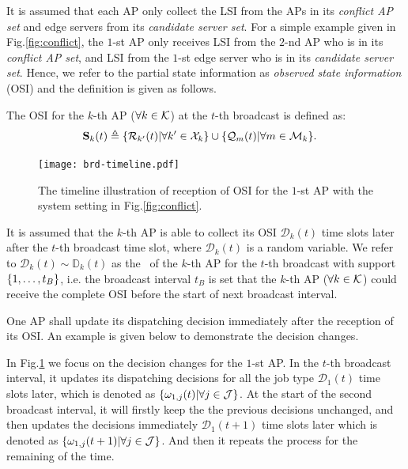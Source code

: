 It is assumed that each AP only collect the LSI from the APs in its \emph{conflict AP set} and edge servers from its \emph{candidate server set}.
For a simple example given in Fig.\ref{fig:conflict}, the $1$-st AP only receives LSI from the $2$-nd AP who is in its \emph{conflict AP set}, and LSI from the $1$-st edge server who is in its \emph{candidate server set}.
Hence, we refer to the partial state information as \emph{observed state information} (OSI) and the definition is given as follows.
\begin{definition}
    The OSI for the $k$-th AP ($\forall k\in\mathcal{K}$) at the $t$-th broadcast is defined as:
    \begin{align}
        \mathbf{S}_{k}(t) &\triangleq \{\mathcal{R}_{k'}(t) | \forall k'\in\mathcal{X}_{k}\}
                         \cup \{\mathcal{Q}_{m}(t) | \forall m\in\mathcal{M}_{k}\}.
        \label{def:OSI}
    \end{align}
\end{definition}

\begin{figure}[t]
    \centering
    \texttt{[image: brd-timeline.pdf]}
    \caption{The timeline illustration of reception of OSI for the $1$-st AP with the system setting in Fig.\ref{fig:conflict}.}
    \label{fig:brd-timeline}
\end{figure}

It is assumed that the $k$-th AP is able to collect its OSI $\mathcal{D}_{k}(t)$ time slots later after the $t$-th broadcast time slot, where $\mathcal{D}_{k}(t)$ is a random variable.
We refer to $\mathcal{D}_{k}(t) \sim \mathbb{D}_{k}(t)$ as the \brlatency~of the $k$-th AP for the $t$-th broadcast with support $\{1,\dots,t_B\}$, i.e. the broadcast interval $t_B$ is set that the $k$-th AP ($\forall k\in\mathcal{K}$) could receive the complete OSI before the start of next broadcast interval.

One AP shall update its dispatching decision immediately after the reception of its OSI.
An example is given below to demonstrate the decision changes.
\begin{example}
    In Fig.\ref{fig:brd-timeline} we focus on the decision changes for the $1$-st AP.
    In the $t$-th broadcast interval, it updates its dispatching decisions for all the job type $\mathcal{D}_{1}(t)$ time slots later, which is denoted as $\{\omega_{1,j}(t) | \forall j\in\mathcal{J}\}$.
    At the start of the second broadcast interval, it will firstly keep the the previous decisions unchanged, and then updates the decisions immediately $\mathcal{D}_{1}(t+1)$ time slots later which is denoted as $\{\omega_{1,j}(t+1) | \forall j\in\mathcal{J}\}$.
    And then it repeats the process for the remaining of the time.
\end{example}

